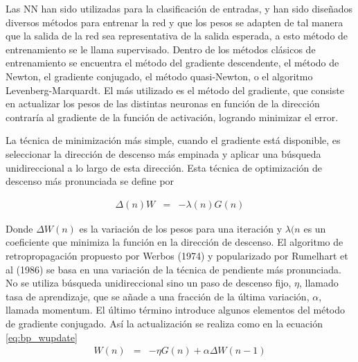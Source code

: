 Las NN han sido utilizadas para la clasificación de entradas, y han sido diseñados diversos métodos para entrenar la red y que los pesos se adapten de tal manera que la salida de la red sea representativa de la salida esperada, a esto método de entrenamiento se le llama supervisado. Dentro de los métodos clásicos de entrenamiento se encuentra el método del gradiente descendente, el método de Newton, el gradiente conjugado, el método quasi-Newton, o el algoritmo Levenberg-Marquardt. El más utilizado es el método del gradiente, que consiste en actualizar los pesos de las distintas neuronas en función de la dirección contraría al gradiente de la función de activación, logrando minimizar el error.

La técnica de minimización más simple, cuando el gradiente está disponible, es seleccionar la dirección de descenso más empinada y aplicar una búsqueda unidireccional a lo largo de esta dirección. Esta técnica de optimización de descenso más pronunciada se define por

\begin{eqnarray}
	\Delta(n) W &=& -\lambda(n)G(n)
\end{eqnarray}

Donde $\Delta W(n)$ es la variación de los pesos para una iteración y $\lambda(n$ es un coeficiente que minimiza la función en la dirección de descenso. %
El algoritmo de retropropagación propuesto por Werbos (1974) y popularizado por Rumelhart et al (1986) se basa en una variación de la técnica de pendiente más pronunciada. No se utiliza búsqueda unidireccional sino un paso de descenso fijo, $\eta$, llamado tasa de aprendizaje, que se añade a una fracción de la última variación, $\alpha$, llamada momentum. El último término introduce algunos elementos del método de gradiente conjugado. %
%
Así la actualización se realiza como en la ecuación \ref{eq:bp_wupdate}
\begin{eqnarray}
	W(n) &=& -\eta G(n) + \alpha\Delta W(n - 1)\label{eq:bp_wupdate}
\end{eqnarray}

